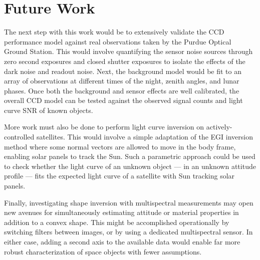 
\chapter{Future Work}

The next step with this work would be to extensively validate the CCD performance model against real observations taken by the Purdue Optical Ground Station. This would involve quantifying the sensor noise sources through zero second exposures and closed shutter exposures to isolate the effects of the dark noise and readout noise. Next, the background model would be fit to an array of observations at different times of the night, zenith angles, and lunar phases. Once both the background and sensor effects are well calibrated, the overall CCD model can be tested against the observed signal counts and light curve SNR of known objects.

More work must also be done to perform light curve inversion on actively-controlled satellites. This would involve a simple adaptation of the EGI inversion method where some normal vectors are allowed to move in the body frame, enabling solar panels to track the Sun. Such a parametric approach could be used to check whether the light curve of an unknown object --- in an unknown attitude profile --- fits the expected light curve of a satellite with Sun tracking solar panels. 

Finally, investigating shape inversion with multispectral measurements may open new avenues for simultaneously estimating attitude or material properties in addition to a convex shape. This might be accomplished operationally by switching filters between images, or by using a dedicated multispectral sensor. In either case, adding a second axis to the available data would enable far more robust characterization of space objects with fewer assumptions.